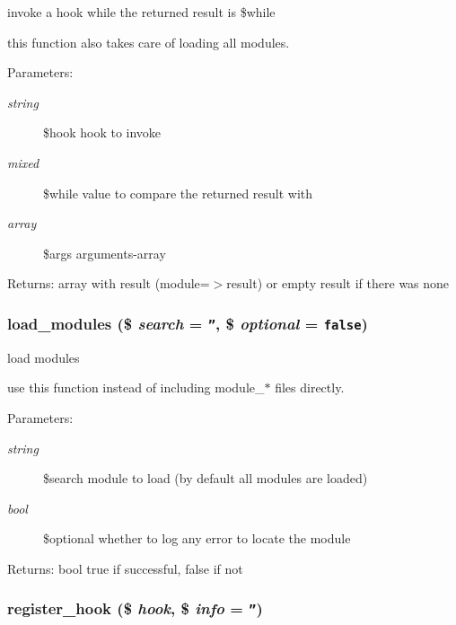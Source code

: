 invoke a hook while the returned result is \$while

this function also takes care of loading all modules. \begin{Desc}
\item[Parameters:]
\begin{description}
\item[{\em string}]\$hook hook to invoke \item[{\em mixed}]\$while value to compare the returned result with \item[{\em array}]\$args arguments-array \end{description}
\end{Desc}
\begin{Desc}
\item[Returns:]array with result (module=$>$result) or empty result if there was none \end{Desc}
\hypertarget{modules_8inc_8php_23f8be02dc2148a3c860119a1d6ea276}{
\subsubsection[{load\_\-modules}]{\setlength{\rightskip}{0pt plus 5cm}load\_\-modules (\$ {\em search} = {\tt ''}, \/  \$ {\em optional} = {\tt false})}}
\label{modules_8inc_8php_23f8be02dc2148a3c860119a1d6ea276}


load modules

use this function instead of including module\_\-$\ast$ files directly. \begin{Desc}
\item[Parameters:]
\begin{description}
\item[{\em string}]\$search module to load (by default all modules are loaded) \item[{\em bool}]\$optional whether to log any error to locate the module \end{description}
\end{Desc}
\begin{Desc}
\item[Returns:]bool true if successful, false if not \end{Desc}
\hypertarget{modules_8inc_8php_d91a5f96df0655d782404170324e567d}{
\subsubsection[{register\_\-hook}]{\setlength{\rightskip}{0pt plus 5cm}register\_\-hook (\$ {\em hook}, \/  \$ {\em info} = {\tt ''})}}
\label{modules_8inc_8php_d91a5f96df0655d782404170324e567d}


